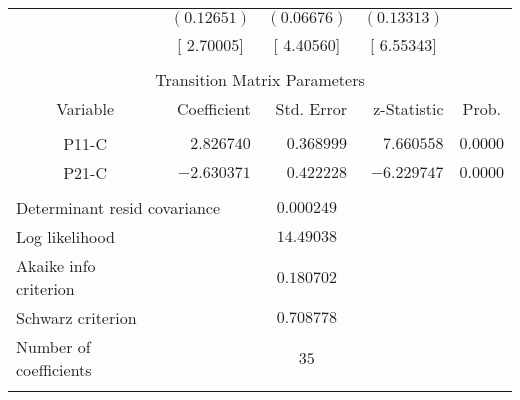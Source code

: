 \begin{tabular}{lrrrr}
\multicolumn{1}{c}{}&\multicolumn{1}{c}{$(0.12651)$}&\multicolumn{1}{c}{$(0.06676)$}&\multicolumn{1}{c}{$(0.13313)$}&\multicolumn{1}{c}{}\\
\multicolumn{1}{c}{}&\multicolumn{1}{c}{[ 2.70005]}&\multicolumn{1}{c}{[ 4.40560]}&\multicolumn{1}{c}{[ 6.55343]}&\multicolumn{1}{c}{}\\
[4.5pt] \hline \\ [-4.5pt]
\multicolumn{5}{c}{Transition Matrix Parameters}\\
\multicolumn{1}{c}{Variable}&\multicolumn{1}{r}{Coefficient}&\multicolumn{1}{r}{Std. Error}&\multicolumn{1}{r}{z-Statistic}&\multicolumn{1}{c}{Prob.}\\
[4.5pt] \hline \\ [-4.5pt]
\multicolumn{1}{c}{P11-C}&\multicolumn{1}{r}{$2.826740$}&\multicolumn{1}{r}{$0.368999$}&\multicolumn{1}{r}{$7.660558$}&\multicolumn{1}{c}{$0.0000$}\\
\multicolumn{1}{c}{P21-C}&\multicolumn{1}{r}{$-2.630371$}&\multicolumn{1}{r}{$0.422228$}&\multicolumn{1}{r}{$-6.229747$}&\multicolumn{1}{c}{$0.0000$}\\
[4.5pt] \hline \\ [-4.5pt]
\multicolumn{2}{l}{Determinant resid covariance}&\multicolumn{1}{c}{$0.000249$}&\multicolumn{1}{c}{}&\multicolumn{1}{c}{}\\
\multicolumn{1}{l}{Log likelihood}&\multicolumn{1}{c}{}&\multicolumn{1}{c}{$14.49038$}&\multicolumn{1}{c}{}&\multicolumn{1}{c}{}\\
\multicolumn{1}{l}{Akaike info criterion}&\multicolumn{1}{c}{}&\multicolumn{1}{c}{$0.180702$}&\multicolumn{1}{c}{}&\multicolumn{1}{c}{}\\
\multicolumn{1}{l}{Schwarz criterion}&\multicolumn{1}{c}{}&\multicolumn{1}{c}{$0.708778$}&\multicolumn{1}{c}{}&\multicolumn{1}{c}{}\\
\multicolumn{1}{l}{Number of coefficients}&\multicolumn{1}{c}{}&\multicolumn{1}{c}{$35$}&\multicolumn{1}{c}{}&\multicolumn{1}{c}{}\\
[4.5pt] \hline \\ [-4.5pt]
\end{tabular}